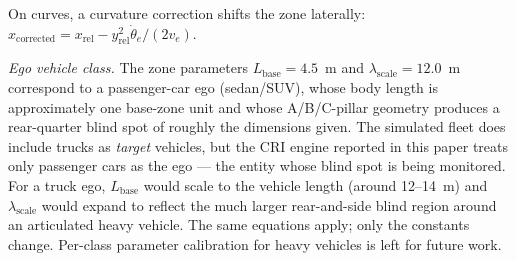 \documentclass[sn-mathphys-num,Numbered,iicol]{sn-jnl}
\begin{document}
On curves, a curvature correction shifts the zone laterally: $x_{\mathrm{corrected}} = x_{\mathrm{rel}} - y_{\mathrm{rel}}^2\dot{\theta}_e/(2v_e)$.

\medskip\noindent
\emph{Ego vehicle class.} The zone parameters $L_{\mathrm{base}} = 4.5$~m and $\lambda_{\mathrm{scale}} = 12.0$~m correspond to a passenger-car ego (sedan/SUV), whose body length is approximately one base-zone unit and whose A/B/C-pillar geometry produces a rear-quarter blind spot of roughly the dimensions given. The simulated fleet does include trucks as \emph{target} vehicles, but the CRI engine reported in this paper treats only passenger cars as the ego --- the entity whose blind spot is being monitored. For a truck ego, $L_{\mathrm{base}}$ would scale to the vehicle length (around 12--14~m) and $\lambda_{\mathrm{scale}}$ would expand to reflect the much larger rear-and-side blind region around an articulated heavy vehicle. The same equations apply; only the constants change. Per-class parameter calibration for heavy vehicles is left for future work.
\end{document}
